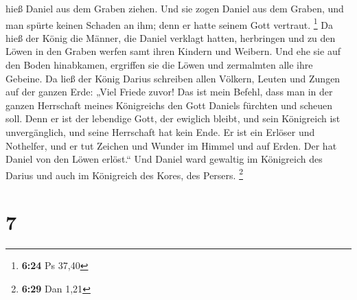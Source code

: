 hieß Daniel aus dem Graben ziehen. Und sie zogen Daniel aus dem Graben,
und man spürte keinen Schaden an ihm; denn er hatte seinem Gott
vertraut. \footnote{\textbf{6:24} Ps 37,40}  Da hieß der
König die Männer, die Daniel verklagt hatten, herbringen und zu den
Löwen in den Graben werfen samt ihren Kindern und Weibern. Und ehe sie
auf den Boden hinabkamen, ergriffen sie die Löwen und zermalmten alle
ihre Gebeine.  Da ließ der König Darius schreiben allen
Völkern, Leuten und Zungen auf der ganzen Erde: „Viel Friede zuvor!
 Das ist mein Befehl, dass man in der ganzen Herrschaft
meines Königreichs den Gott Daniels fürchten und scheuen soll. Denn er
ist der lebendige Gott, der ewiglich bleibt, und sein Königreich ist
unvergänglich, und seine Herrschaft hat kein Ende.  Er
ist ein Erlöser und Nothelfer, und er tut Zeichen und Wunder im Himmel
und auf Erden. Der hat Daniel von den Löwen erlöst.`` 
Und Daniel ward gewaltig im Königreich des Darius und auch im Königreich
des Kores, des Persers. \footnote{\textbf{6:29} Dan 1,21}

\hypertarget{section-4}{%
\section{7}\label{section-4}}

